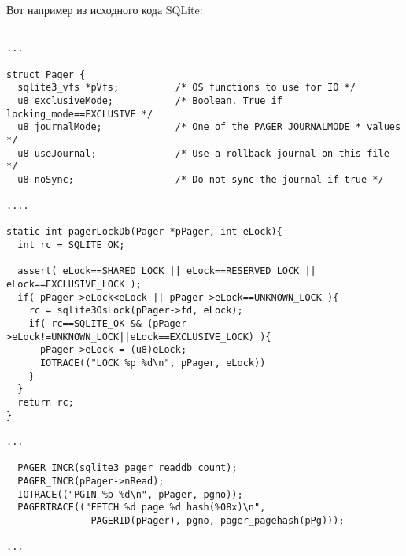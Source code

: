 Вот например из исходного кода SQLite:

\begin{lstlisting}

...

struct Pager {
  sqlite3_vfs *pVfs;          /* OS functions to use for IO */
  u8 exclusiveMode;           /* Boolean. True if locking_mode==EXCLUSIVE */
  u8 journalMode;             /* One of the PAGER_JOURNALMODE_* values */
  u8 useJournal;              /* Use a rollback journal on this file */
  u8 noSync;                  /* Do not sync the journal if true */

....

static int pagerLockDb(Pager *pPager, int eLock){
  int rc = SQLITE_OK;

  assert( eLock==SHARED_LOCK || eLock==RESERVED_LOCK || eLock==EXCLUSIVE_LOCK );
  if( pPager->eLock<eLock || pPager->eLock==UNKNOWN_LOCK ){
    rc = sqlite3OsLock(pPager->fd, eLock);
    if( rc==SQLITE_OK && (pPager->eLock!=UNKNOWN_LOCK||eLock==EXCLUSIVE_LOCK) ){
      pPager->eLock = (u8)eLock;
      IOTRACE(("LOCK %p %d\n", pPager, eLock))
    }
  }
  return rc;
}

...

  PAGER_INCR(sqlite3_pager_readdb_count);
  PAGER_INCR(pPager->nRead);
  IOTRACE(("PGIN %p %d\n", pPager, pgno));
  PAGERTRACE(("FETCH %d page %d hash(%08x)\n",
               PAGERID(pPager), pgno, pager_pagehash(pPg)));

...

\end{lstlisting}

